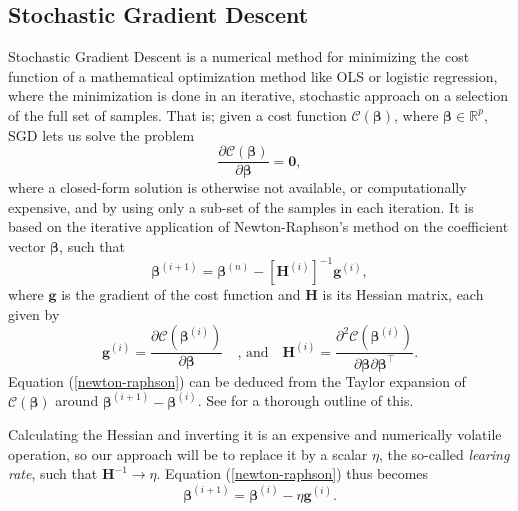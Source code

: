 \documentclass[]{article}
\begin{document}
\subsection{Stochastic Gradient Descent}
Stochastic Gradient Descent is a numerical method for minimizing the cost function of a mathematical optimization method like OLS or logistic regression, where the minimization is done in an iterative, stochastic approach on a selection of the full set of samples. That is; given a cost function $\mathcal{C}(\mathbf{\beta})$, where $\mathbf{\beta} \in \mathbb{R}^p$, SGD lets us solve the problem
\begin{equation}
	\frac{\partial \mathcal{C}(\mathbf{\beta})}{\partial \mathbf{\beta}} = \mathbf{0},
\end{equation}
where a closed-form solution is otherwise not available, or computationally expensive, and by using only a sub-set of the samples in each iteration. It is based on the iterative application of Newton-Raphson's method on the coefficient vector $\mathbf{\beta}$, such that
\begin{equation} \label{newton-raphson}
	\mathbf{\beta}^{(i+1)} = \mathbf{\beta}^{(n)} - [\mathbf{H}^{(i)}]^{-1}\mathbf{g}^{(i)},
\end{equation}
where $\mathbf{g}$ is the gradient of the cost function and $\mathbf{H}$ is its Hessian matrix, each given by
\begin{equation}
	\mathbf{g}^{(i)} = \frac{\partial \mathcal{C}(\mathbf{\beta}^{(i)})}{\partial \mathbf{\beta}} \quad \text{, and} \quad 
	\mathbf{H}^{(i)} = \frac{\partial^2 \mathcal{C}(\mathbf{\beta}^{(i)})}{\partial \mathbf{\beta} \partial \mathbf{\beta}^\intercal}.
\end{equation}
Equation (\ref{newton-raphson}) can be deduced from the Taylor expansion of $\mathcal{C}(\mathbf{\beta})$ around $\mathbf{\beta}^{(i+1)} - \mathbf{\beta}^{(i)}$. See \cite{fys-stk4155-notes} for a thorough outline of this.

Calculating the Hessian and inverting it is an expensive and numerically volatile operation, so our approach will be to replace it by a scalar $\eta$, the so-called \textit{learing rate}, such that $\mathbf{H}^{-1} \rightarrow \eta$. Equation (\ref{newton-raphson}) thus becomes
\begin{equation} \label{newton-raphson-eta}
	\mathbf{\beta}^{(i+1)} = \mathbf{\beta}^{(i)} - \eta \mathbf{g}^{(i)}.
\end{equation}
\end{document}
